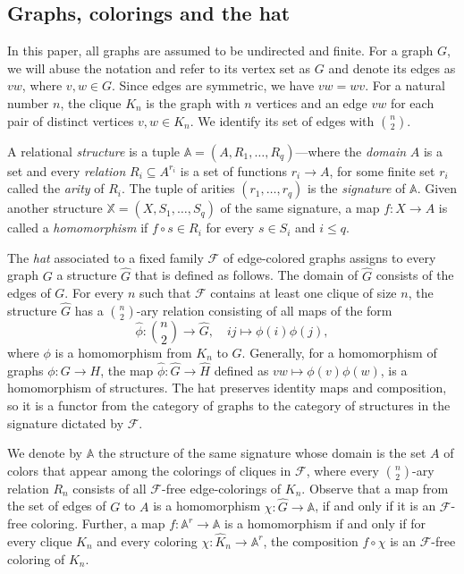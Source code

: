 \documentclass[oneside]{amsart}
\newcommand{\str}[1]{\mathbb{#1}}
\newcommand{\cat}[1]{\mathcal{#1}}
\begin{document}
\subsection{Graphs, colorings and the hat}\label{sec:graphcolhat}

In this paper, all graphs are assumed to be undirected and finite.
For a graph $G$, we will abuse the notation and refer to its vertex set as $G$ and denote its edges as $vw$, where $v,w \in G$. Since edges are symmetric, we have $vw =wv$.
For a natural number $n$, the clique $K_n$ is the graph with $n$ vertices and an edge $vw$ for each pair of distinct vertices $v,w\in K_n$. We identify its set of edges with $\binom{n}{2}$.

A relational \emph{structure} is a tuple $\str A = (A, R_1,\dots, R_q)$---where the \emph{domain} $A$ is a set and every \emph{relation} $R_i\subseteq A^{r_i}$ is a set of functions $r_i \to A$, for some finite set $r_i$ called the \emph{arity} of $R_i$. 
The tuple of arities $(r_1,\ldots, r_q)$ is the \emph{signature} of $\str A$.
Given another structure $\str X=(X,S_1, \dots, S_q)$ of the same signature, a map $f\colon X \to A$ is called a \emph{homomorphism} if $f\circ s\in R_i$ for every $s\in S_i$ and $i\leq q$.

The \emph{hat} associated to a fixed family $\cat F$ of edge-colored graphs assigns to every graph $G$ a structure $\hat G$ that is defined as follows.
The domain of $\hat G$ consists of the edges of $G$.
For every $n$ such that $\cat F$ contains at least one clique of size $n$, the structure $\hat G$ has a $\binom{n}{2}$-ary relation consisting of all maps of the form 
$$
\hat \phi \colon \binom{n}{2} \to \hat G, \quad ij \mapsto \phi(i)\phi(j),
$$ 
where $\phi$ is a homomorphism from $K_n$ to $G$. 
Generally, for a homomorphism of graphs $\phi\colon G \to H$, the map $\hat \phi\colon \hat G \to \hat H$ defined as $vw \mapsto \phi(v) \phi(w)$, is a homomorphism of structures. The hat preserves identity maps and composition, so it is a functor from the category of graphs to the category of structures in the signature dictated by $\cat F$.

We denote by $\str A$ the structure of the same signature whose domain is the set $A$ of colors that appear among the colorings of cliques in $\cat F$, where every $\binom{n}{2}$-ary relation $R_n$ consists of all $\cat F$-free edge-colorings of $K_n$.
Observe that a map from the set of edges of $G$ to $A$ is a homomorphism $\chi\colon \hat G\to \str A$, if and only if it is an $\cat F$-free coloring.
Further, a map $f\colon \str A^r \to \str A$ is a homomorphism
if and only if for every clique $K_n$ and every coloring $\chi \colon \hat K_n \to \str A^r$, the composition $f\circ \chi$ is an $\cat F$-free coloring of $K_n$.
\end{document}
